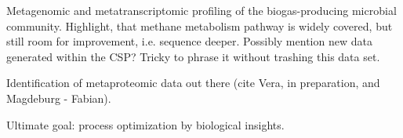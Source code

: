 \documentclass{bmcart}
\begin{document}
Metagenomic and metatranscriptomic profiling of the biogas-producing microbial community.
Highlight, that methane metabolism pathway is widely covered, but still room for improvement, i.e. sequence deeper.
Possibly mention new data generated within the CSP? Tricky to phrase it without trashing this data set.

Identification of metaproteomic data out there (cite Vera, in preparation, and Magdeburg - Fabian).

Ultimate goal: process optimization by biological insights.

\end{document}
